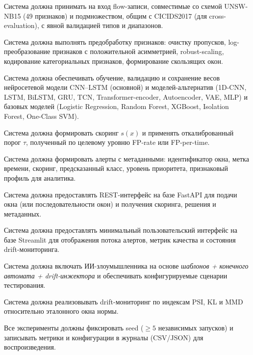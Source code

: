 \begin{description}[font=\normalfont\bfseries, leftmargin=2.5em]
    \item[FR-1.] Система должна принимать на вход flow-записи, совместимые
    со схемой UNSW-NB15 (49 признаков) и подмножеством, общим с CICIDS2017
    (для cross-evaluation), с явной валидацией типов и диапазонов.
    \item[FR-2.] Система должна выполнять предобработку признаков:
    очистку пропусков, log-преобразование признаков с положительной
    асимметрией, robust-scaling, кодирование категориальных признаков,
    формирование скользящих окон.
    \item[FR-3.] Система должна обеспечивать обучение, валидацию и сохранение
    весов нейросетевой модели CNN--LSTM (основной) и моделей-альтернатив
    (1D-CNN, LSTM, BiLSTM, GRU, TCN, Transformer-encoder, Autoencoder, VAE,
    MLP) и базовых моделей (Logistic Regression, Random Forest, XGBoost,
    Isolation Forest, One-Class SVM).
    \item[FR-4.] Система должна формировать скоринг \(s(x)\) и применять
    откалиброванный порог \(\tau\), полученный по целевому уровню FP-rate
    или FP-per-time.
    \item[FR-5.] Система должна формировать алерты с метаданными:
    идентификатор окна, метка времени, скоринг, предсказанный класс,
    уровень приоритета, признаковый профиль для аналитика.
    \item[FR-6.] Система должна предоставлять REST-интерфейс на базе FastAPI
    для подачи окна (или последовательности окон) и получения скоринга,
    решения и метаданных.
    \item[FR-7.] Система должна предоставлять минимальный пользовательский
    интерфейс на базе Streamlit для отображения потока алертов, метрик
    качества и состояния drift-мониторинга.
    \item[FR-8.] Система должна включать ИИ-злоумышленника на основе
    \emph{шаблонов + конечного автомата + drift-инжектора} и обеспечивать
    конфигурируемые сценарии тестирования.
    \item[FR-9.] Система должна реализовывать drift-мониторинг по индексам
    PSI, KL и MMD относительно эталонного окна нормы.
    \item[FR-10.] Все эксперименты должны фиксировать seed
    (\(\geq 5\) независимых запусков) и записывать метрики и
    конфигурации в журналы (CSV/JSON) для воспроизведения.
\end{description}

